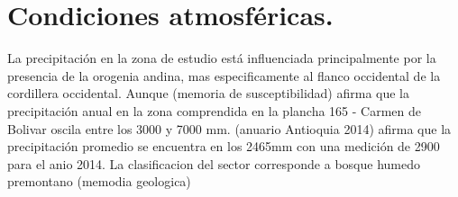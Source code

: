 \section{Condiciones atmosf\'{e}ricas.}
La precipitaci\'{o}n en la zona de estudio est\'{a} influenciada principalmente por la presencia de la orogenia andina, mas especificamente al flanco occidental de la cordillera occidental. Aunque (memoria de susceptibilidad) afirma que la precipitaci\'{o}n anual en la zona comprendida en la plancha 165 - Carmen de Bolivar oscila entre los 3000 y 7000 mm. (anuario Antioquia 2014) afirma que la precipitaci\'{o}n promedio se encuentra en los 2465mm  con una medici\'{o}n de 2900 para el anio 2014. La clasificacion del sector corresponde a bosque humedo premontano (memodia geologica)

